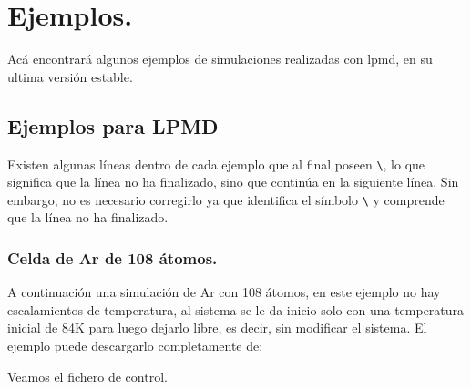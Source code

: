 \chapter{Ejemplos.}
\label{chap:exa}

Ac\'a encontrar\'a algunos ejemplos de simulaciones realizadas con lpmd, en su ultima versi\'on estable.

\section{Ejemplos para LPMD}

Existen algunas l\'ineas dentro de cada ejemplo que al final poseen \verb|\|, lo que significa que la l\'inea no ha finalizado, sino que contin\'ua en la siguiente l\'inea. Sin embargo, no es necesario corregirlo ya que {\lpmd} identifica el s\'imbolo \verb|\| y comprende que la l\'inea no ha finalizado.

\subsection{Celda de Ar de 108 \'atomos.}

A continuaci\'on una simulaci\'on de Ar con 108 \'atomos, en este ejemplo no hay escalamientos de temperatura, al sistema se le da inicio solo con una temperatura inicial de 84K para luego dejarlo libre, es decir, sin modificar el sistema. El ejemplo puede descargarlo completamente de:


Veamos el fichero de control.

